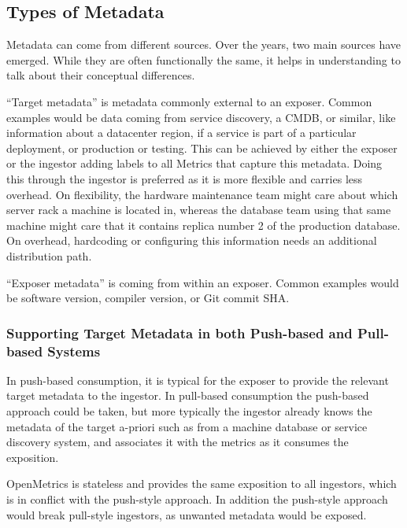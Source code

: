 \documentclass[a4paper,12pt,notitlepage,twoside,openright]{article}
\begin{document}
\hypertarget{types-of-metadata}{%
\subsection{Types of Metadata}\label{types-of-metadata}}

Metadata can come from different sources. Over the years, two main
sources have emerged. While they are often functionally the same, it
helps in understanding to talk about their conceptual differences.

``Target metadata'' is metadata commonly external to an exposer. Common
examples would be data coming from service discovery, a CMDB, or
similar, like information about a datacenter region, if a service is
part of a particular deployment, or production or testing. This can be
achieved by either the exposer or the ingestor adding labels to all
Metrics that capture this metadata. Doing this through the ingestor is
preferred as it is more flexible and carries less overhead. On
flexibility, the hardware maintenance team might care about which server
rack a machine is located in, whereas the database team using that same
machine might care that it contains replica number 2 of the production
database. On overhead, hardcoding or configuring this information needs
an additional distribution path.

``Exposer metadata'' is coming from within an exposer. Common examples
would be software version, compiler version, or Git commit SHA.

\hypertarget{supporting-target-metadata-in-both-push-based-and-pull-based-systems}{%
\subsubsection{Supporting Target Metadata in both Push-based and
Pull-based
Systems}\label{supporting-target-metadata-in-both-push-based-and-pull-based-systems}}

In push-based consumption, it is typical for the exposer to provide the
relevant target metadata to the ingestor. In pull-based consumption the
push-based approach could be taken, but more typically the ingestor
already knows the metadata of the target a-priori such as from a machine
database or service discovery system, and associates it with the metrics
as it consumes the exposition.

OpenMetrics is stateless and provides the same exposition to all
ingestors, which is in conflict with the push-style approach. In
addition the push-style approach would break pull-style ingestors, as
unwanted metadata would be exposed.
\end{document}
